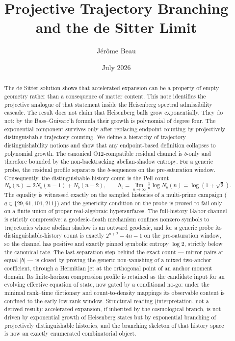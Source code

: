 \documentclass[11pt]{article}
\title{Projective Trajectory Branching and the de Sitter Limit}
\author{J\'er\^ome Beau}
\date{July 2026}
\newcommand{\Nb}{N_b}
\newcommand{\hb}{h_b}
\begin{document}
\maketitle

\begin{abstract}
The de Sitter solution shows that accelerated expansion can be a property of empty geometry rather than a
consequence of matter content.
This note identifies the projective analogue of that statement inside the Heisenberg spectral admissibility
cascade.
The result does not claim that Heisenberg balls grow exponentially.
They do not: by the Bass--Guivarc'h formula their growth is polynomial of degree four.
The exponential component survives only after replacing endpoint counting by projectively distinguishable
trajectory counting.
We define a hierarchy of trajectory distinguishability notions and show that any endpoint-based definition
collapses to polynomial growth.
The canonical O12-compatible residual channel is $b$-only and therefore bounded by the non-backtracking
abelian-shadow entropy.
For a generic probe, the residual profile separates the $b$-sequences on the pre-saturation window.
Consequently, the distinguishable-history count is the Pell count
\[
\Nb(n)=2\Nb(n-1)+\Nb(n-2),
\qquad
\hb=\lim_{n\to\infty}\tfrac{1}{n}\log \Nb(n)=\log(1+\sqrt{2}).
\]
The equality is witnessed exactly on the sampled histories of a multi-prime campaign
($q\in\{29,61,101,211\}$) and the genericity condition on the probe is proved to fail only on a finite union
of proper real-algebraic hypersurfaces.
The full-history Gabor channel is strictly compressive: a geodesic-death mechanism confines nonzero symbols
to trajectories whose abelian shadow is an outward geodesic, and for a generic probe its
distinguishable-history count is exactly $2^{n+2}-4n-1$ on the pre-saturation window, so the channel has
positive and exactly pinned symbolic entropy $\log 2$, strictly below the canonical rate.
The last separation step behind the exact count --- mirror pairs at equal $|b|$ --- is closed by proving
the generic non-vanishing of a mixed two-anchor coefficient, through a Hermitian jet at the orthogonal
point of an anchor moment domain.
Its finite-horizon compression profile is retained as the candidate input for an evolving effective equation
of state, now gated by a conditional no-go: under the minimal rank--time dictionary and count-to-density
mappings its observable content is confined to the early low-rank window.
Structural reading (interpretation, not a derived result): accelerated expansion, if inherited by the
cosmological branch, is not driven by exponential growth of Heisenberg states but by exponential branching
of projectively distinguishable histories, and the branching skeleton of that history space is now an
exactly enumerated combinatorial object.
\end{abstract}
\end{document}
